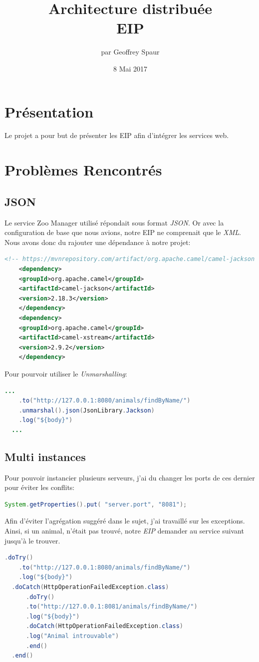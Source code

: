 \documentclass{article}
\title{Architecture distribuée \\ EIP}
\author{par Geoffrey Spaur}
\date{8 Mai 2017}
\begin{document}
\maketitle
\newpage
\tableofcontents{}
\newpage
\section{Présentation}
  Le projet a pour but de présenter les EIP afin d'intégrer les services web.
\section{Problèmes Rencontrés}
  \subsection{JSON}
    Le service Zoo Manager utilisé répondait sous format \emph{JSON}. 
    Or avec la configuration de base que nous avions, notre EIP ne comprenait que le \emph{XML}.
    Nous avons donc du rajouter une dépendance à notre projet:
    \begin{lstlisting}[language=xml]
  <!-- https://mvnrepository.com/artifact/org.apache.camel/camel-jackson -->
    <dependency>
	<groupId>org.apache.camel</groupId>
	<artifactId>camel-jackson</artifactId>
	<version>2.18.3</version>
    </dependency>
    <dependency>
	<groupId>org.apache.camel</groupId>
	<artifactId>camel-xstream</artifactId>
	<version>2.9.2</version>
    </dependency>
    \end{lstlisting}
    Pour pourvoir utiliser le \emph{Unmarshalling}:
    \begin{lstlisting}[language=java]
  ...
    .to("http://127.0.0.1:8080/animals/findByName/")
    .unmarshal().json(JsonLibrary.Jackson)
    .log("${body}")
  ...
    \end{lstlisting}
  \subsection{Multi instances}
    Pour pouvoir instancier plusieurs serveurs, j'ai du changer les ports de ces dernier pour éviter les conflits:
    \begin{lstlisting}[language=java]
  System.getProperties().put( "server.port", "8081");
    \end{lstlisting}
    Afin d'éviter l'agrégation suggéré dans le sujet, j'ai travaillé sur les exceptions.
    Ainsi, si un animal, n'était pas trouvé, notre \emph{EIP} demander au service suivant jusqu'à le trouver.
    \begin{lstlisting}[language=java]
  .doTry()
    .to("http://127.0.0.1:8080/animals/findByName/")
    .log("${body}")
  .doCatch(HttpOperationFailedException.class)
      .doTry()
	  .to("http://127.0.0.1:8081/animals/findByName/")
	  .log("${body}")
      .doCatch(HttpOperationFailedException.class)
	  .log("Animal introuvable")
      .end()
  .end()
    \end{lstlisting}
\end{document}
